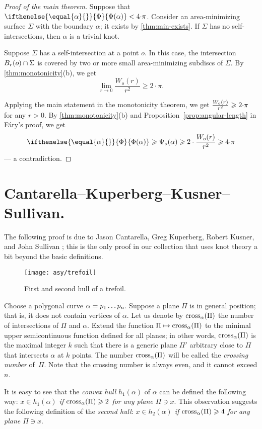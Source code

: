 \documentclass{article}
\newcommand*{\z}[1]{#1\nobreak\discretionary{}%
            {\hbox{$\mathsurround=0pt #1$}}{}}
\theoremstyle{theorem}
\newtheorem{Crofton-type formula}[theorem]{Crofton-type formula}
\newtheorem{Douglas--Rado theorem}[theorem]{Douglas--Rado theorem}
\newtheorem{Extended monotonicity theorem}[theorem]{Extended monotonicity theorem}
\theoremstyle{definition}
\def\cross{\mathop{\rm cross}\nolimits}
\newcommand*{\tc}[1]{\ifthenelse{\equal{#1}{}}{\Phi}{\Phi({#1})}}%
\def\ge{\geqslant}
\begin{document}
\begin{proof}[Proof of the main theorem]
Suppose that $\tc\alpha<4{\cdot}\pi$.
Consider an area-minimizing surface $\Sigma$ with the boundary $\alpha$; it exists by \ref{thm:min-exists}.
If $\Sigma$ has no self-intersections, then $\alpha$ is a trivial knot.

Suppose $\Sigma$ has a self-intersection at a point $o$.
In this case, the intersection $B_r(o)\z\cap \Sigma$ is covered by two or more small area-minimizing subdiscs of $\Sigma$.
By \ref{thm:monotonicity}(b), we get 
\[\lim_{r\to0}\frac{W_o(r)}{r^2}\ge 2{\cdot}\pi.\]

Applying the main statement in the monotonicity theorem, we get $\frac{W_o(r)}{r^2}\z\ge 2{\cdot}\pi$ for any $r>0$.
By \ref{thm:monotonicity}(b) and Proposition~\ref{prop:angular-length} in Fáry's proof, we get
\[\tc{\alpha}\ge \Psi_o(\alpha)\ge 2\cdot \frac{W_o(r)}{r^2}\ge 4{\cdot}\pi\]
--- a contradiction.
\end{proof}


\section{Cantarella--Kuperberg--Kusner--Sullivan.}\label{sec:2nd-hull}

The following proof is due to Jason Cantarella, Greg Kuperberg, Robert Kusner, and John Sullivan \cite{CKKS};
this is the only proof in our collection that uses knot theory a bit beyond the basic definitions.

\begin{figure}[!ht]
\vskip-0mm
\centering
\texttt{[image: asy/trefoil]}
\caption{First and second hull of a trefoil.}
\vskip0mm
\end{figure}

Choose a polygonal curve $\alpha\z=p_1\dots p_n$.
Suppose a plane $\Pi$ is in general position; that is, it does not contain vertices of $\alpha$.
Let us denote by $\cross_\alpha(\Pi)$ the number of intersections of $\Pi$ and $\alpha$.
Extend the function $\Pi\z\mapsto \cross_\alpha(\Pi)$ to the minimal upper semicontinuous function defined for all planes;
in other words, $\cross_\alpha(\Pi)$ is the maximal integer $k$ such that there is a generic plane $\Pi'$ arbitrary close to $\Pi$ that intersects $\alpha$ at $k$ points.
The number $\cross_\alpha(\Pi)$ will be called the \emph{crossing number} of~$\Pi$.
Note that the crossing number is always even, and it cannot exceed $n$.

It is easy to see that the \emph{convex hull} $h_1(\alpha)$ of $\alpha$ can be defined the following way:
\textit{$x\in h_1(\alpha)$ if $\cross_\alpha(\Pi)\z\ge2$ for any plane $\Pi\ni x$}.
This observation suggests the following definition of the \emph{second hull}:
\textit{$x\in h_2(\alpha)$ if $\cross_\alpha(\Pi)\ge4$ for any plane $\Pi\ni x$}.
\end{document}
